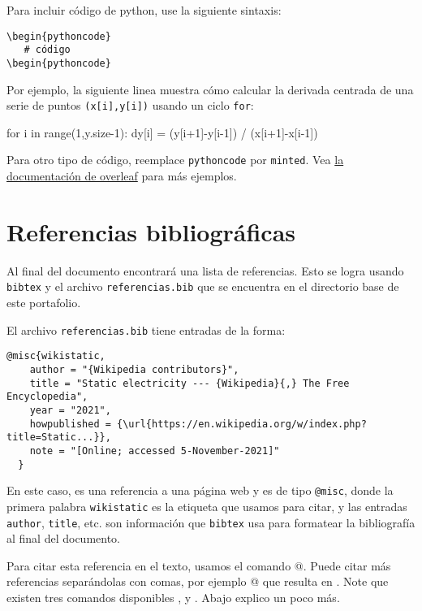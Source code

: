 \documentclass[../portafolio.tex]{subfiles}
\begin{document}
Para incluir código de python, use la siguiente sintaxis:
\begin{verbatim}
\begin{pythoncode}
   # código
\begin{pythoncode}
\end{verbatim}

Por ejemplo, la siguiente linea muestra cómo calcular la derivada centrada de una serie de puntos \texttt{(x[i],y[i])} usando un ciclo \texttt{for}:
\begin{pythoncode}
for i in range(1,y.size-1):
    dy[i] = (y[i+1]-y[i-1]) / (x[i+1]-x[i-1])
\end{pythoncode}

Para otro tipo de código, reemplace \texttt{pythoncode} por \texttt{minted}. Vea \href{https://www.overleaf.com/learn/latex/Code_Highlighting_with_minted}{la documentación de overleaf} para más ejemplos.


\section{Referencias bibliográficas}
Al final del documento encontrará una lista de referencias. Esto se logra usando \texttt{bibtex} y el archivo \texttt{referencias.bib} que se encuentra en el directorio base de este portafolio.

El archivo \texttt{referencias.bib} tiene entradas de la forma:
\begin{verbatim}
@misc{wikistatic,
    author = "{Wikipedia contributors}",
    title = "Static electricity --- {Wikipedia}{,} The Free Encyclopedia",
    year = "2021",
    howpublished = {\url{https://en.wikipedia.org/w/index.php?title=Static...}},
    note = "[Online; accessed 5-November-2021]"
  }
\end{verbatim}

En este caso, es una referencia a una página web y es de tipo \verb!@misc!, donde la primera palabra \texttt{wikistatic} es la etiqueta que usamos para citar, y las entradas \texttt{author}, \texttt{title}, etc. son información que \texttt{bibtex} usa para formatear la bibliografía al final del documento.

Para citar esta referencia en el texto, usamos el comando \verb@\citep{wikistatic}@. Puede citar más referencias separándolas con comas, por ejemplo \verb@\citep{wikistatic,AF:2003,CEL:arXiv}@ que resulta en \citep{wikistatic,AF:2003,CEL:arXiv}. Note que existen tres comandos disponibles \verb@\cite@, \verb@\citet@ y \verb@\citep@. Abajo explico un poco más.
\end{document}
